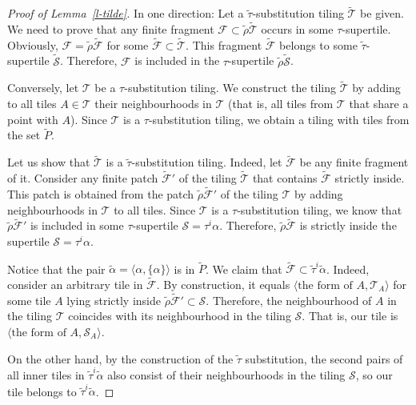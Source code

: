 \documentclass[12pt]{article}
\theoremstyle{remark}
\newcommand{\pair}[1]{\langle #1\rangle}
\begin{document}
\begin{proof}[Proof of Lemma~\ref{l-tilde}]
In one direction:
Let a $\tilde\tau$-substitution tiling $\tilde{\mathcal T}$ be given. We need to prove that
any finite fragment
$\mathcal F\subset\tilde\rho\tilde{\mathcal T}$
occurs in some $\tau$-supertile.
Obviously, $\mathcal F=\tilde\rho \tilde{\mathcal F}$ for some $\tilde{\mathcal F}\subset\tilde{\mathcal T}$. This fragment
$\tilde{ \mathcal F}$ belongs to some $\tilde\tau$-supertile $\tilde{\mathcal S}$. Therefore,
$\mathcal F$ is included in the $\tau$-supertile $\tilde\rho\tilde{\mathcal S}$.

Conversely, let $\mathcal T$ be a $\tau$-substitution tiling.
We construct the tiling $\tilde{\mathcal T}$ by adding to all tiles $A\in\mathcal T$ their
neighbourhoods in $\mathcal T$ (that is, all tiles from $\mathcal T$ that share a point with $A$). 
Since $\mathcal T$ is a $\tau$-substitution tiling, we obtain a tiling with tiles from the set $\tilde P$.

Let us show  that $\tilde{\mathcal T}$ is a $\tilde\tau$-substitution tiling.
Indeed, let $\tilde{\mathcal F}$ be any finite fragment of it. Consider any finite
patch $\tilde{\mathcal F}'$ of the tiling $\tilde{\mathcal T}$ that contains $\tilde{\mathcal F}$ strictly inside. This patch
is obtained from the patch $\tilde\rho\tilde{\mathcal F}'$ of the tiling $\mathcal T$ by adding
neighbourhoods in $\mathcal T$ to all tiles. Since $\mathcal T$ is a $\tau$-substitution tiling,
we know that $\tilde\rho\tilde {\mathcal F}'$ is included in some $\tau$-supertile $\mathcal S=\tau^i\alpha$.
Therefore, $\tilde\rho \tilde{\mathcal F}$ is strictly inside the supertile $\mathcal S=\tau^i\alpha$.

Notice that the pair 
$\tilde\alpha=\pair{\alpha,\{\alpha\}}$  is in $\tilde P$.
We claim that
$\tilde{\mathcal F}\subset\tilde \tau^i\tilde\alpha$.
Indeed, consider an arbitrary tile in $\tilde{\mathcal F}$.
By construction, it equals $\pair{\text{the form of }A, \mathcal T_A}$ for some tile $A$ lying strictly inside
$\tilde\rho\tilde{\mathcal F}'\subset\mathcal S$. Therefore, the neighbourhood of $A$ in the tiling $\mathcal T$ coincides with its neighbourhood in the tiling $\mathcal S$. That is, our tile is $\pair{\text{the form of }A, \mathcal S_A}$.

On the other hand, by the construction of the $\tilde\tau$ substitution, the second pairs
of all inner tiles in $\tilde\tau^i\tilde \alpha$ also consist of their neighbourhoods in
the tiling $\mathcal S$, so our tile belongs to $\tilde\tau^i\tilde \alpha$.
\end{proof}
\end{document}
